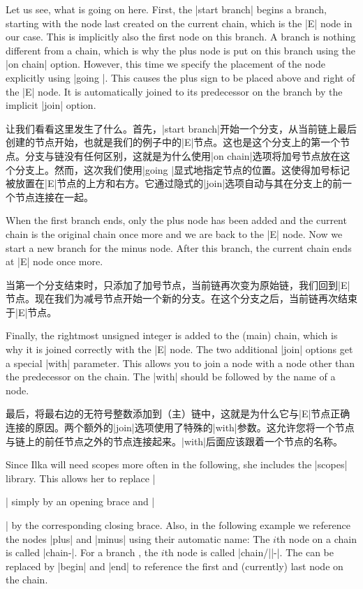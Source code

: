 Let us see, what is going on here. First, the |start branch| begins a
branch, starting with the node last created on the current chain,
which is the |E| node in our case. This is implicitly also the first
node on this branch. A branch is nothing different from a chain, which
is why the plus node is put on this branch using the |on chain|
option. However, this time we specify the placement of the node
explicitly using |going |. This causes the plus sign
to be placed above and right of the |E| node. It is automatically
joined to its predecessor on the branch by the implicit |join|
option.

让我们看看这里发生了什么。首先，|start branch|开始一个分支，从当前链上最后创建的节点开始，也就是我们的例子中的|E|节点。这也是这个分支上的第一个节点。分支与链没有任何区别，这就是为什么使用|on chain|选项将加号节点放在这个分支上。然而，这次我们使用|going |显式地指定节点的位置。这使得加号标记被放置在|E|节点的上方和右方。它通过隐式的|join|选项自动与其在分支上的前一个节点连接在一起。

When the first branch ends, only the plus node has been added and the
current chain is the original chain once more and we are back to the
|E| node. Now we start a new branch for the minus node. After this
branch, the current chain ends at |E| node once more.

当第一个分支结束时，只添加了加号节点，当前链再次变为原始链，我们回到|E|节点。现在我们为减号节点开始一个新的分支。在这个分支之后，当前链再次结束于|E|节点。

Finally, the rightmost unsigned integer is added to the (main) chain,
which is why it is joined correctly with the |E| node. The two
additional |join| options get a special |with| parameter. This allows
you to join a node with a node other than the predecessor on the
chain. The  |with| should be followed by the name of a node.

最后，将最右边的无符号整数添加到（主）链中，这就是为什么它与|E|节点正确连接的原因。两个额外的|join|选项使用了特殊的|with|参数。这允许您将一个节点与链上的前任节点之外的节点连接起来。|with|后面应该跟着一个节点的名称。

Since Ilka will need scopes more often in the following, she includes
the |scopes| library. This allows her to replace |\begin{scope}|
  simply by an opening brace and  |\end{scope}| by the corresponding
closing brace. Also, in the following example we reference
the nodes |plus| and |minus| using
their automatic name: The $i$th node on a chain is called
|chain-|. For a branch , the $i$th node is called
|chain/||-|. The  can be replaced by
|begin| and |end| to reference the first and (currently) last node on
the chain.

